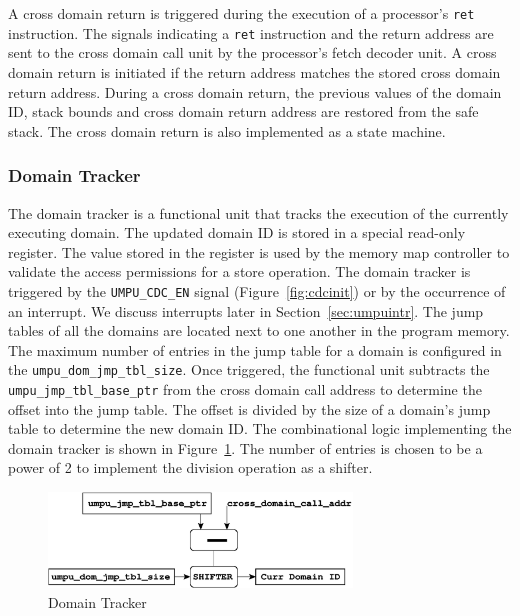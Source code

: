 A cross domain return is triggered during the execution of a processor's \texttt{ret} instruction.
%
The signals indicating a \texttt{ret} instruction and the return address are sent to the cross domain call unit by the processor's fetch decoder unit.
%
A cross domain return is initiated if the return address matches the stored cross domain return address.
%
During a cross domain return, the previous values of the domain ID, stack bounds and cross domain return address are restored from the safe stack.
%
The cross domain return is also implemented as a state machine.
%
\subsubsection{Domain Tracker}
\label{sec:domtracker}
%
The domain tracker is a functional unit that tracks the execution of
the currently executing domain.
%
The updated domain ID is stored in a special read-only register.
%
The value stored in the register is used by the memory map controller
to validate the access permissions for a store operation.
%
The domain tracker is triggered by the \texttt{UMPU\_CDC\_EN} signal
(Figure~\ref{fig:cdcinit}) or by the occurrence of an interrupt.
%
We discuss interrupts later in Section~\ref{sec:umpuintr}.
%
The jump tables of all the domains are located next to one another in
the program memory.
%
The maximum number of entries in the jump table for a domain is
configured in the \texttt{umpu\_dom\_jmp\_tbl\_size}.
%
Once triggered, the functional unit subtracts the
\texttt{umpu\_jmp\_tbl\_base\_ptr} from the cross domain call address
to determine the offset into the jump table.
%
The offset is divided by the size of a domain's jump table to
determine the new domain ID.
%
The combinational logic implementing the domain tracker is shown in
Figure~\ref{fig:domtracker}.
%
The number of entries is chosen to be a power of 2 to implement the
division operation as a shifter.
%
 \begin{figure}[htbp]
    \centering
    \includegraphics[height=1in,
    keepaspectratio=true]{figures/domtracker.eps} 
    \caption{Domain Tracker}
    \label{fig:domtracker}
 \end{figure}

